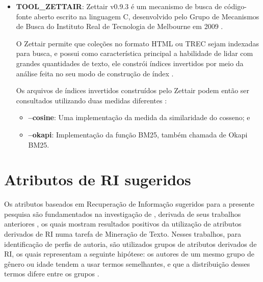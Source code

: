 \begin{itemize}
        Utiliza da linguagem de consulta AQL (\textit{ArangoDB Query Language}) para recuperar e modificar dados, que, por meio das \textit{views}
        \footnote{``Uma \textit{view} (visão) em terminologia SQL é uma única tabela que é derivada de outras tabelas [$\cdots$]  é considerada uma tabela virtual'' \cite[p.~88]{ElmasriSBD2010}.}
         do tipo arangosearch, introduz uma camada de integração com a biblioteca IResearch
        \footnote{Biblioteca de mecanismo de busca orientada a documentos, multiplataforma, e de alto desempenho, escrita inteiramente em C++, com o foco em uma conectividade de diferentes modelos de ranqueamento/similaridade \cite{IRESEARCH_GITHUB_2019}.}
        .
        Assim, por meio da AQL integrada ao IResearch, o ArangoDB fornece funções de ordenação de documentos mediante uma consulta, e, dentre elas, a função BM25() faz uma implementação do algoritmo da função de ranqueamento BM25 \cite{ARANGODB_SEARCHVIEWS_2019}.
        
        \item \textbf{TOOL\_ZETTAIR}: Zettair v0.9.3 é um mecanismo de busca de código-fonte aberto escrito na linguagem C, desenvolvido pelo Grupo de Mecanismos de Busca do Instituto Real de Tecnologia de Melbourne em 2009 \cite{ZETTAIR_HOME_2009}.

        O Zettair permite que coleções no formato HTML ou TREC sejam indexadas para busca, e possui como característica principal a habilidade de lidar com grandes quantidades de texto, ele constrói índices invertidos por meio da análise feita no seu modo de construção de índex \cite{ZETTAIR_INDEX_2009}.
        
        Os arquivos de índices invertidos construídos pelo Zettair podem então ser consultados utilizando duas medidas diferentes \cite{ZETTAIR_USAGE_2009}:
        \begin{itemize}
            \item \textbf{--cosine}: Uma implementação da medida da similaridade do cosseno; e
            
            \item \textbf{--okapi}: Implementação da função BM25, também chamada de Okapi BM25.
        \end{itemize}
    \end{itemize}

\section{Atributos de RI sugeridos}  \label{sec:Atributos-de-RI-sugeridos}
    Os atributos baseados em Recuperação de Informação sugeridos para a presente pesquisa são fundamentados na investigação de , derivada de seus trabalhos anteriores \cite{WEREN_CLEF_2014,WEREN_ARTIGO_2014}, os quais mostram resultados positivos da utilização de atributos derivados de RI numa tarefa de Mineração de Texto.
    Nesses trabalhos, para identificação de perfis de autoria, são utilizados grupos de atributos derivados de RI, os quais representam a seguinte hipótese: os autores de um mesmo grupo de gênero ou idade tendem a usar termos semelhantes, e que a distribuição desses termos difere entre os grupos \cite[p.~20]{WEREN_MESTRADO_2014}.
    
